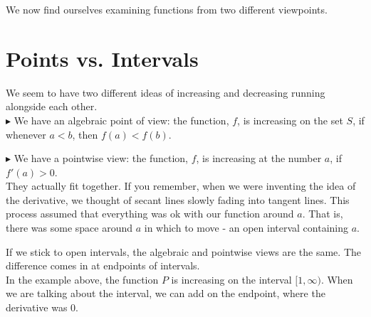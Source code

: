 \documentclass{ximera}
\begin{document}
We now find ourselves examining functions from two different viewpoints. \\



\section{ Points vs. Intervals}




We seem to have two different ideas of increasing and decreasing running alongside each other. \\



$\blacktriangleright$ We have an algebraic point of view: the function, $f$, is increasing on the set $S$, if whenever $a < b$, then $f(a) < f(b)$.



$\blacktriangleright$ We have a pointwise view: the function, $f$, is increasing at the number $a$, if $f'(a) > 0$. \\



They actually fit together. If you remember, when we were inventing the idea of the derivative, we thought of secant lines slowly fading into tangent lines.  This process assumed that everything was ok with our function around $a$.  That is, there was some space around $a$ in which to move - an open interval containing $a$.

If we stick to open intervals, the algebraic and pointwise views are the same.  The difference comes in at endpoints of intervals. \\


In the example above, the function $P$ is increasing on the interval $[1, \infty)$.  When we are talking about the interval, we can add on the endpoint, where the derivative was $0$.
\end{document}
